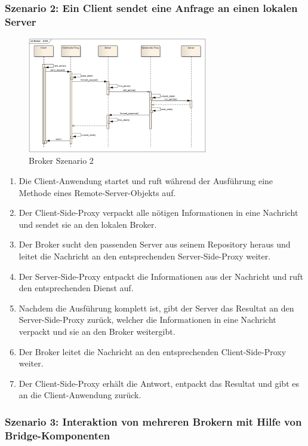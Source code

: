 \subsubsection*{Szenario 2: Ein Client sendet eine Anfrage an einen lokalen Server}

\begin{figure}[H]
	\centering
	\includegraphics[width=0.7\textwidth]{content/posa1/images/broker-scen2.png}
	\caption{Broker Szenario 2}
\end{figure}

\begin{enumerate}
	\item Die Client-Anwendung startet und ruft während der Ausführung eine Methode eines Remote-Server-Objekts auf.
	\item Der Client-Side-Proxy verpackt alle nötigen Informationen in eine Nachricht und sendet sie an den lokalen Broker.
	\item Der Broker sucht den passenden Server aus seinem Repository heraus und leitet die Nachricht an den entsprechenden Server-Side-Proxy weiter.
	\item Der Server-Side-Proxy entpackt die Informationen aus der Nachricht und ruft den entsprechenden Dienst auf.
	\item Nachdem die Ausführung komplett ist, gibt der Server das Resultat an den Server-Side-Proxy zurück, welcher die Informationen in eine Nachricht verpackt und sie an den Broker weitergibt.
	\item Der Broker leitet die Nachricht an den entsprechenden Client-Side-Proxy weiter.
	\item Der Client-Side-Proxy erhält die Antwort, entpackt das Resultat und gibt es an die Client-Anwendung zurück.
\end{enumerate}

\subsubsection*{Szenario 3: Interaktion von mehreren Brokern mit Hilfe von Bridge-Komponenten}

